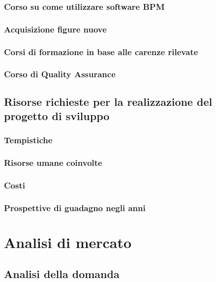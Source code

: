 \subsubsection{Corso su come utilizzare software BPM}

\subsubsection{Acquisizione figure nuove}

\subsubsection{Corsi di formazione in base alle carenze rilevate} 

\subsubsection{Corso di Quality Assurance}
  
\subsection{Risorse richieste per la realizzazione del progetto di sviluppo}
\subsubsection{Tempistiche}

\subsubsection{Risorse umane coinvolte}

\subsubsection{Costi}

\subsubsection{ Prospettive di guadagno negli anni}

\clearpage

\section{Analisi di mercato}
\subsection{Analisi della domanda}

